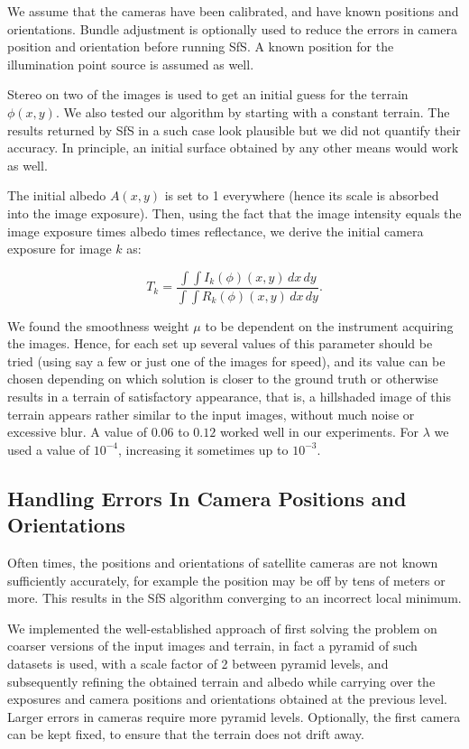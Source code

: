 \documentclass[12pt,oneside]{article}
\begin{document}
We assume that the cameras have been calibrated, and have known
positions and orientations. Bundle adjustment is optionally used to
reduce the errors in camera position and orientation before running
SfS. A known position for the illumination point source is assumed as
well.

Stereo on two of the images is used to get an initial guess for the
terrain $\phi(x, y).$ We also tested our algorithm by starting
with a constant terrain. The results returned by SfS in a such case look
plausible but we did not quantify their accuracy. In principle,
an initial surface obtained by any other means would work as well.

The initial albedo $A(x, y)$ is set to 1 everywhere (hence
its scale is absorbed into the image exposure). Then, using the fact that
the image intensity equals the image exposure times albedo times
reflectance, we derive the initial camera exposure for image $k$ as:

$$
T_k = \frac{ \int\!\! \int \! I_k(\phi)(x, y) \,dx\,dy }{ \int\!\! \int \! R_k(\phi)(x, y) \,dx\,dy}.
$$

We found the smoothness weight $\mu$ to be dependent on the instrument
acquiring the images. Hence, for each set up several values of
this parameter should be tried (using say a few or just one of the
images for speed), and its value can be chosen depending on which
solution is closer to the ground truth or otherwise results in a terrain
of satisfactory appearance, that is, a hillshaded image of this terrain
appears rather similar to the input images, without much noise or
excessive blur. A value of $0.06$ to $0.12$ worked well in our experiments.
For $\lambda$ we used a value of $10^{-4}$, increasing it sometimes up to $10^{-3}.$

\subsection{Handling Errors In Camera Positions and Orientations}
\label{multires}

Often times, the positions and orientations of satellite cameras
are not known sufficiently accurately, for example the position may be off by tens of meters or more.
This results in the SfS algorithm converging to an incorrect local minimum. 

We implemented the well-established approach of
first solving the problem on coarser versions of the input images and
terrain, in fact a pyramid of such datasets is used, with a scale factor
of 2 between pyramid levels, and subsequently refining the obtained
terrain and albedo while carrying over the exposures and camera
positions and orientations obtained at the previous level. Larger errors
in cameras require more pyramid levels. Optionally, the first camera can
be kept fixed, to ensure that the terrain does not drift away.
\end{document}
